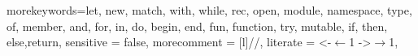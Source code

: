 \usepackage{listings}
\usepackage{color}
    {morekeywords={let, new, match, with, while, rec, open, module, namespace, type, of, member, and, for, in, do, begin, end, fun, function, try, mutable, if, then, else,return}, 
    sensitive = false, %
    morecomment = [l]{//},
    literate = %
        {<-}{$\leftarrow{}$}{1}
        {->}{$\rightarrow{}$}{1},
    }

